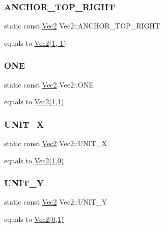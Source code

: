 \subsubsection{\texorpdfstring{A\+N\+C\+H\+O\+R\+\_\+\+T\+O\+P\+\_\+\+R\+I\+G\+HT}{ANCHOR\_TOP\_RIGHT}}
{\footnotesize\ttfamily static const \hyperlink{classVec2}{Vec2} Vec2\+::\+A\+N\+C\+H\+O\+R\+\_\+\+T\+O\+P\+\_\+\+R\+I\+G\+HT\hspace{0.3cm}{\ttfamily [static]}}

equals to \hyperlink{classVec2}{Vec2(1, 1)} \mbox{\label{classVec2_a6b62ec70b5f9d4b6f78341a73b38d328}} 
\subsubsection{\texorpdfstring{O\+NE}{ONE}}
{\footnotesize\ttfamily static const \hyperlink{classVec2}{Vec2} Vec2\+::\+O\+NE\hspace{0.3cm}{\ttfamily [static]}}

equals to \hyperlink{classVec2}{Vec2(1,1)} \mbox{\label{classVec2_a27246f9cb36cc90f9b8d5abbcab43abb}} 
\subsubsection{\texorpdfstring{U\+N\+I\+T\+\_\+X}{UNIT\_X}}
{\footnotesize\ttfamily static const \hyperlink{classVec2}{Vec2} Vec2\+::\+U\+N\+I\+T\+\_\+X\hspace{0.3cm}{\ttfamily [static]}}

equals to \hyperlink{classVec2}{Vec2(1,0)} \mbox{\label{classVec2_a7b47ef0848a379cc5085ea0b3f2a1182}} 
\subsubsection{\texorpdfstring{U\+N\+I\+T\+\_\+Y}{UNIT\_Y}}
{\footnotesize\ttfamily static const \hyperlink{classVec2}{Vec2} Vec2\+::\+U\+N\+I\+T\+\_\+Y\hspace{0.3cm}{\ttfamily [static]}}

equals to \hyperlink{classVec2}{Vec2(0,1)} \mbox{\label{classVec2_adf8ee322d4b4bcc04146762c018d731f}} 
